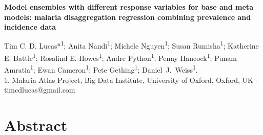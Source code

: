 \documentclass[11pt]{article}
\begin{document}



\small{

\begin{center}
\textbf{Model ensembles with different response variables for base and meta models: malaria disaggregation regression combining prevalence and incidence data}
\end{center}



\begin{center}
{Tim C. D. Lucas*\textsuperscript{1}; Anita Nandi\textsuperscript{1}; Michele Nguyen\textsuperscript{1}; 
Susan Rumisha\textsuperscript{1}; 
Katherine E. Battle\textsuperscript{1}; Rosalind E. Howes\textsuperscript{1}; Andre Python\textsuperscript{1}; Penny Hancock\textsuperscript{1}; Punam Amratia\textsuperscript{1};
Ewan Cameron\textsuperscript{1}; Pete Gething\textsuperscript{1}; Daniel~J.~Weiss\textsuperscript{1}.}\\
{1. Malaria Atlas Project, Big Data Institute, University of Oxford, Oxford, UK - timcdlucas@gmail.com}\\ 


\end{center}
\section{Abstract}




}
\end{document}
